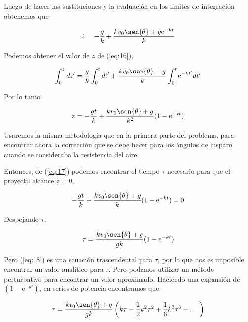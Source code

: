 \documentclass[a4paper,10pt]{article}
\numberwithin{equation}{section}
\newcommand{\euler}{\mathrm{e}}
\begin{document}
Luego de hacer las sustituciones y la evaluación en los límites de integración
obtenemos que

\begin{equation}
 \dot{z} = - \frac{g}{k} + \frac{k v_0 \sen{\theta}+g\euler^{-kt}}{k}
 \label{eq:16}
\end{equation}

Podemos obtener el valor de $z$ de (\ref{eq:16}),

\begin{equation}
 \int_0^z dz' = \frac{g}{k} \int_0^t dt' + \frac{k v_0 \sen{\theta}+g}{k} \int_0^t \euler^{-kt'}dt'
\end{equation}

Por lo tanto

\begin{equation}
 z = - \frac{gt}{k}+ \frac{k v_0 \sen{\theta}+g}{k^2}(1-\euler^{-kt})
 \label{eq:17}
\end{equation}

Usaremos la misma metodología que en la primera parte del problema,
para encontrar ahora la corrección que se debe hacer para los ángulos
de disparo cuando se consideraba la resistencia del aire.

\vspace{.3cm}

Entonces, de (\ref{eq:17}) podemos encontrar el tiempo $\tau$ necesario
para que el proyectil alcance $z=0$,

\begin{equation}
 - \frac{gt}{k}+ \frac{k v_0 \sen{\theta}+g}{k}(1-\euler^{-kt}) = 0
\end{equation}

Despejando $\tau$, 

\begin{equation}
 \tau = \frac{k v_0 \sen{\theta}+g}{gk}(1-\euler^{-kt})
 \label{eq:18}
\end{equation}

Pero (\ref{eq:18}) es una ecuación trascendental para $\tau$, por lo 
que nos es imposible encontrar un valor analítico para $\tau$. Pero
podemos utilizar un método perturbativo para encontrar un valor aproximado.
Haciendo una expansión de $(1-\euler^{-kt})$, en series de potencia encontramos que

\begin{equation}
 \tau = \frac{k v_0 \sen{\theta}+g}{gk}\left(k\tau - \frac{1}{2}k^2\tau^2
 +\frac{1}{6}k^3\tau^3 - \dots \right)
\end{equation}
\end{document}
